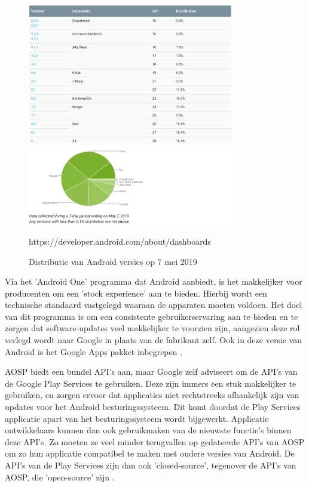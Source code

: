 \begin{figure}
    \centering
    \includegraphics[width=0.8\textwidth]{img/fragmentation.png}
    \caption{Distributie van Android versies op 7 mei 2019}
    \label{fig:androidfragmentation}
    \medskip
    \small
    https://developer.android.com/about/dashboards
\end{figure}

Via het 'Android One' programma dat Android aanbiedt, is het makkelijker voor producenten om een 'stock experience' aan te bieden. Hierbij wordt een technische standaard vastgelegd waaraan de apparaten moeten voldoen. Het doel van dit programma is om een consistente gebruikerservaring aan te bieden en te zorgen dat software-updates veel makkelijker te voorzien zijn, aangezien deze rol verlegd wordt naar Google in plaats van de fabrikant zelf. Ook in deze versie van Android is het Google Apps pakket inbegrepen \autocite{android_androidone}.

AOSP biedt een bundel API's  aan, maar Google zelf adviseert om de API's van de Google Play Services te gebruiken. Deze zijn immers een stuk makkelijker te gebruiken, en zorgen ervoor dat applicaties niet rechtstreeks afhankelijk zijn van updates voor het Android besturingssysteem. Dit komt doordat de Play Services applicatie apart van het besturingssysteem wordt bijgewerkt. Applicatie ontwikkelaars kunnen dan ook gebruikmaken van de nieuwste functie's binnen deze API's. Zo moeten ze veel minder terugvallen op gedateerde API's van AOSP om zo hun applicatie compatibel te maken met oudere versies van Android.  De API's van de Play Services zijn dan ook 'closed-source', tegenover de API's van AOSP, die 'open-source' zijn \autocite{marshall_google-play-services}. 

